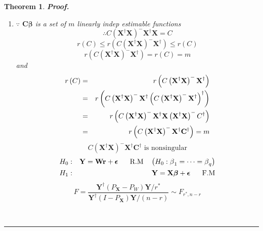 \documentclass{article}
\newtheorem{theorem}{Theorem}
\newenvironment{proof}[1][Proof]{\noindent\textbf{#1.} }{\ \rule{0.5em}{0.5em}}
\begin{document}
\begin{theorem}
\begin{proof}
\begin{enumerate}
\item $\because $ $\mathbf{C\beta }$ is a set of $m$ linearly indep
estimable functions%
\begin{equation*}
\therefore C\left( \mathbf{X}^{\dagger }\mathbf{X}\right) ^{-}\mathbf{X}%
^{\dagger }\mathbf{X=}C
\end{equation*}%
\begin{equation*}
r\left( C\right) \leq r\left( C\left( \mathbf{X}^{\dagger }\mathbf{X}\right)
^{-}\mathbf{X}^{\dagger }\right) \leq r\left( C\right) 
\end{equation*}%
\begin{equation*}
r\left( C\left( \mathbf{X}^{\dagger }\mathbf{X}\right) ^{-}\mathbf{X}%
^{\dagger }\right) =r\left( C\right) =m
\end{equation*}%
and%
\begin{eqnarray*}
r\left( C\right)  &=&r\left( C\left( \mathbf{X}^{\dagger }\mathbf{X}\right)
^{-}\mathbf{X}^{\dagger }\right)  \\
&=&r\left( C\left( \mathbf{X}^{\dagger }\mathbf{X}\right) ^{-}\mathbf{X}%
^{\dagger }\left( C\left( \mathbf{X}^{\dagger }\mathbf{X}\right) ^{-}\mathbf{%
X}^{\dagger }\right) ^{\dagger }\right)  \\
&=&r\left( C\left( \mathbf{X}^{\dagger }\mathbf{X}\right) ^{-}\mathbf{X}%
^{\dagger }\mathbf{X}\left( \mathbf{X}^{\dagger }\mathbf{X}\right)
^{-}C^{\dagger }\right)  \\
&=&r\left( C\left( \mathbf{X}^{\dagger }\mathbf{X}\right) ^{-}\mathbf{X}%
^{\dagger }\mathbf{C}^{\dagger }\right) =m
\end{eqnarray*}%
\begin{equation*}
C\left( \mathbf{X}^{\dagger }\mathbf{X}\right) ^{-}\mathbf{X}^{\dagger }%
\mathbf{C}^{\dagger }\text{ is nonsingular}
\end{equation*}%
\begin{eqnarray*}
H_{0} &:&\mathbf{Y=Wr+\epsilon }\text{\quad R.M\quad }\left( H_{0}:\beta
_{1}=\cdots =\beta _{q}\right)  \\
H_{1} &:&\mathbf{Y=X\beta +\epsilon }\text{\quad F.M}
\end{eqnarray*}%
\begin{equation*}
F=\frac{\mathbf{Y}^{\dagger }\left( P_{\mathbf{X}}-P_{W}\right) \mathbf{Y}%
/r^{\ast }}{\mathbf{Y}^{\dagger }\left( I-P_{\mathbf{X}}\right) \mathbf{Y}%
/\left( n-r\right) }\sim F_{r^{\ast },n-r}
\end{equation*}
\end{enumerate}
\end{proof}
\end{theorem}
\end{document}

